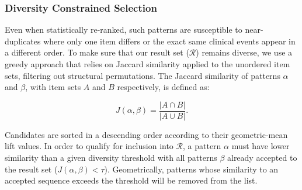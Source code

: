 \subsubsection*{Diversity Constrained Selection}

Even when statistically re-ranked, such patterns are susceptible to near-duplicates where only one item differs or the exact same clinical events appear in a different order. To make sure that our result set ($\mathcal{R}$) remains diverse, we use a greedy approach that relies on Jaccard similarity applied to the unordered item sets, filtering out structural permutations. The Jaccard similarity of patterns $\alpha$ and $\beta$, with item sets $A$ and $B$ respectively, is defined as:

\begin{equation}
    J(\alpha, \beta) = \frac{|A \cap B|}{|A \cup B|}.
    \label{eq:jaccard}
\end{equation}

Candidates are sorted in a descending order according to their geometric-mean lift values. In order to qualify for inclusion into $\mathcal{R}$, a pattern $\alpha$ must have lower similarity than a given diversity threshold with all patterns $\beta$ already accepted to the result set ($J(\alpha, \beta) < \tau$). Geometrically, patterns whose similarity to an accepted sequence exceeds the threshold will be removed from the list.
